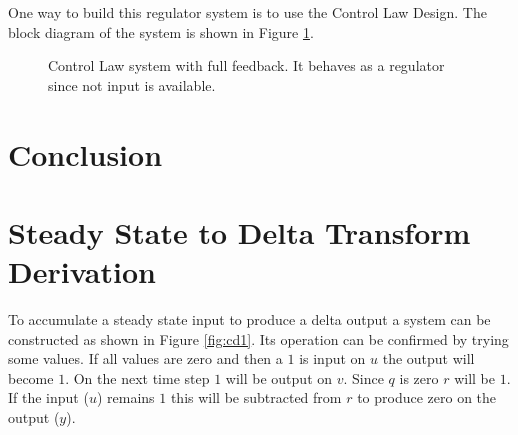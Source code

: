 \documentclass{article}
\begin{document}
One way to build this regulator system is to use the
Control Law Design\autocite[Pg. 280]{franklin1998digital}.
The block diagram of the system is shown in Figure \ref{fig:clff1}.

\begin{figure}[hpb!]
\begin{center}


\end{center}

\caption{Control Law system with full feedback.
It behaves as a regulator since not input is available.}
\label{fig:clff1}
\end{figure}


\clearpage
\section{Conclusion}

\clearpage
\printbibliography[heading=bibintoc]

\clearpage
\appendix

\clearpage
\section{Steady State to Delta Transform Derivation}
\label{app:cdelta}

To accumulate a steady state input to produce a delta output
a system can be constructed as shown in Figure \ref{fig:cd1}.
Its operation can be confirmed by trying some values.
If all values are zero and then a $1$ is input on $u$ the
output will become $1$.
On the next time step $1$ will be output on $v$.
Since $q$ is zero $r$ will be $1$.
If the input ($u$) remains $1$ this will be subtracted from $r$
to produce zero on the output ($y$).
\end{document}
